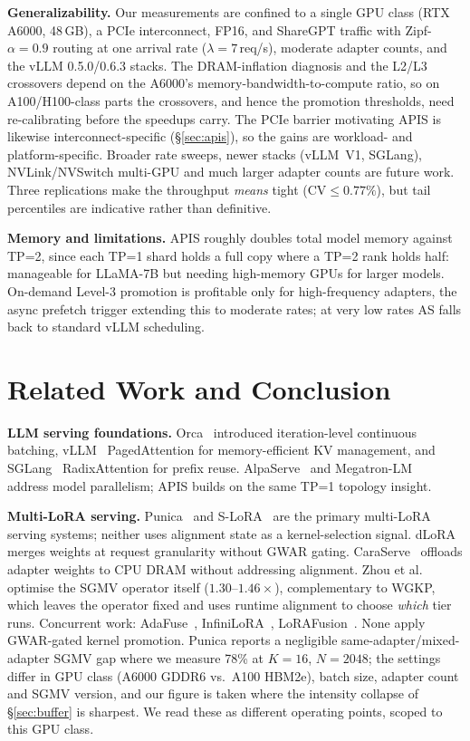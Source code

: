 \documentclass[conference]{IEEEtran}
\newcommand{\asys}{AS\xspace}
\newcommand{\lora}{LoRA\xspace}
\begin{document}
\textbf{Generalizability.}
Our measurements are confined to a single GPU class (RTX A6000, 48\,GB), a PCIe
interconnect, FP16, and ShareGPT traffic with Zipf-$\alpha{=}0.9$ routing at one
arrival rate ($\lambda{=}7$\,req/s), moderate adapter counts, and the vLLM
0.5.0/0.6.3 stacks. The DRAM-inflation diagnosis and the L2/L3 crossovers depend
on the A6000's memory-bandwidth-to-compute ratio, so on A100/H100-class parts the
crossovers, and hence the promotion thresholds, need re-calibrating before the
speedups carry. The PCIe barrier motivating APIS is likewise interconnect-specific
(\S\ref{sec:apis}), so the gains are workload- and platform-specific.
Broader rate sweeps, newer stacks (vLLM~V1, SGLang), NVLink/NVSwitch multi-GPU and
much larger adapter counts are future work. Three replications make the throughput
\emph{means} tight (CV${\le}0.77\%$), but tail percentiles are indicative rather
than definitive.

\textbf{Memory and limitations.}
APIS roughly doubles total model memory against TP=2, since each TP=1 shard holds
a full copy where a TP=2 rank holds half: manageable for LLaMA-7B but needing
high-memory GPUs for larger models.  On-demand Level-3 promotion is profitable
only for high-frequency adapters, the async prefetch trigger extending this to
moderate rates; at very low rates \asys falls back to standard vLLM scheduling.

\section{Related Work and Conclusion}
\label{sec:related}

\textbf{LLM serving foundations.}
Orca~\cite{yu2022orca} introduced iteration-level continuous batching,
vLLM~\cite{kwon2023vllm} PagedAttention for memory-efficient KV management, and
SGLang~\cite{zheng2023sglang} RadixAttention for prefix reuse.
AlpaServe~\cite{li2023alpaserve} and Megatron-LM~\cite{shoeybi2019megatronlm}
address model parallelism; APIS builds on the same TP=1 topology insight.

\textbf{Multi-LoRA serving.}
Punica~\cite{chen2024punica} and S-LoRA~\cite{sheng2023slora} are the primary
multi-\lora serving systems; neither uses alignment state as a kernel-selection
signal.  dLoRA~\cite{wu2024dlora} merges weights at request granularity without
GWAR gating.  CaraServe~\cite{li2024caraserve} offloads adapter weights to CPU
DRAM without addressing alignment.
Zhou et al.~\cite{zhou2025dynop} optimise the SGMV operator itself
($1.30$--$1.46{\times}$), complementary to WGKP, which leaves the operator fixed
and uses runtime alignment to choose \emph{which} tier runs.
Concurrent work: AdaFuse~\cite{li2026adafuse}, InfiniLoRA~\cite{chen2026infinilora},
LoRAFusion~\cite{zhu2026lorafusion}.  None apply GWAR-gated kernel promotion.
Punica reports a negligible same-adapter/mixed-adapter SGMV gap where we measure
78\% at $K{=}16$, $N{=}2048$; the settings differ in GPU class (A6000 GDDR6 vs.\
A100 HBM2e), batch size, adapter count and SGMV version, and our figure is taken
where the intensity collapse of \S\ref{sec:buffer} is sharpest.  We read these as
different operating points, scoped to this GPU class.
\end{document}
